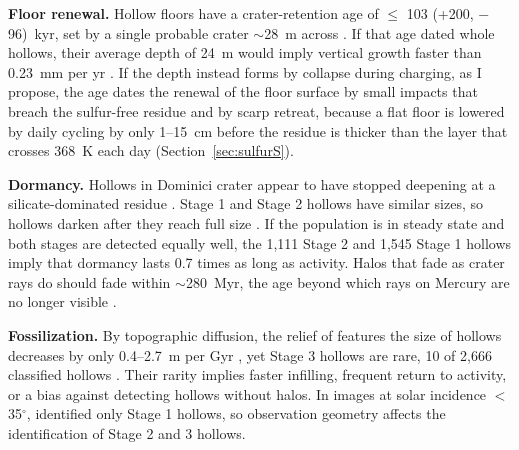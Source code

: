 \documentclass{planetary}
\begin{document}
\textbf{Floor renewal.} Hollow floors have a crater-retention age of $\leq$ 103 (+200, $-$96)~kyr, set by a single probable crater $\sim$28~m across \parencite{wang2020}. If that age dated whole hollows, their average depth of 24~m would imply vertical growth faster than 0.23~mm per yr \parencite{wang2020}. If the depth instead forms by collapse during charging, as I propose, the age dates the renewal of the floor surface by small impacts that breach the sulfur-free residue and by scarp retreat, because a flat floor is lowered by daily cycling by only 1--15~cm before the residue is thicker than the layer that crosses 368~K each day (Section~\ref{sec:sulfurS}).

\textbf{Dormancy.} Hollows in Dominici crater appear to have stopped deepening at a silicate-dominated residue \parencite{emran2025}. Stage 1 and Stage 2 hollows have similar sizes, so hollows darken after they reach full size \parencite{deutsch2025}. If the population is in steady state and both stages are detected equally well, the 1,111 Stage 2 and 1,545 Stage 1 hollows imply that dormancy lasts 0.7 times as long as activity. Halos that fade as crater rays do should fade within $\sim$280~Myr, the age beyond which rays on Mercury are no longer visible \parencite{banks2017}.

\textbf{Fossilization.} By topographic diffusion, the relief of features the size of hollows decreases by only 0.4--2.7~m per Gyr \parencite{phillips2021}, yet Stage 3 hollows are rare, 10 of 2,666 classified hollows \parencite{deutsch2025}. Their rarity implies faster infilling, frequent return to activity, or a bias against detecting hollows without halos. In images at solar incidence $<$ 35$^\circ$, \textcite{deutsch2025} identified only Stage 1 hollows, so observation geometry affects the identification of Stage 2 and 3 hollows.
\end{document}
